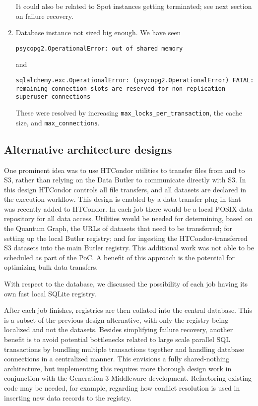 \begin{enumerate}
It could also be related to Spot instances getting terminated;
see next section on failure recovery.
\item Database instance not sized big enough.
We have seen
\begin{lstlisting}[style=basherror]
psycopg2.OperationalError: out of shared memory
\end{lstlisting}
and
\begin{lstlisting}[style=basherror]
sqlalchemy.exc.OperationalError: (psycopg2.OperationalError) FATAL:  remaining connection slots are reserved for non-replication superuser connections
\end{lstlisting}
These were resolved by increasing \texttt{max\_locks\_per\_transaction}, the cache size, and \texttt{max\_connections}.
\end{enumerate}


\subsection{Alternative architecture designs}


One prominent idea was to use HTCondor utilities to transfer files from and to S3, rather than relying on the Data Butler to communicate directly with S3.
In this design HTCondor controls all file transfers, and all datasets are declared in the execution workflow.
This design is enabled by a data transfer plug-in that was recently added to HTCondor.
In each job there would be a local POSIX data repository for all data access.
Utilities would be needed for determining, based on the Quantum Graph, the URLs of datasets that need to be transferred; for setting up the local Butler registry; and for ingesting the HTCondor-transferred S3 datasets into the main Butler registry.
This additional work was not able to be scheduled as part of the PoC.
A benefit of this approach is the potential for optimizing bulk data transfers.

With respect to the database, we discussed the possibility of each job having its own fast local SQLite registry.

After each job finishes, registries are then collated into the central database.
This is a subset of the previous design alternative, with only the registry being localized and not the datasets.
Besides simplifying failure recovery, another benefit is to avoid potential bottlenecks related to large scale parallel SQL transactions by bundling multiple transactions together and handling database connections in a centralized manner.
This envisions a fully shared-nothing architecture, but implementing this requires more thorough design work in conjunction with the Generation 3 Middleware development.
Refactoring existing code may be needed, for example, regarding how conflict resolution is used in inserting new data records to the registry.


